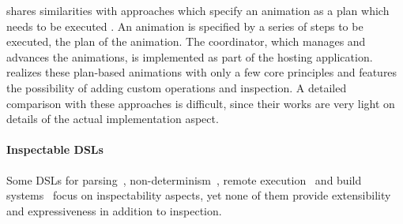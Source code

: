 \dsl{} shares similarities with approaches which specify an animation as a plan
which needs to be executed
\cite{DBLP:conf/chi/KurlanderL95,DBLP:conf/eics/MirlacherPB12}. An
animation is specified by a series of steps to be executed, the
plan of the animation. The coordinator, which manages and advances the
animations, is implemented as part of the hosting application. \dsl{} realizes
these plan-based animations with only a few core principles and features the
possibility of adding custom operations and inspection. A detailed comparison
with these approaches is difficult, since their works are very light on
details of the actual implementation aspect.

\paragraph{Inspectable DSLs}

Some DSLs for
parsing~\cite{DBLP:journals/scp/Hughes00,DBLP:journals/corr/CapriottiK14,DBLP:conf/icfp/Lindley14},
non-determinism~\cite{DBLP:journals/corr/abs-1905-06544}, remote
execution~\cite{DBLP:conf/haskell/Gibbons16,DBLP:conf/haskell/GillSDEFGRSS15}
and build systems~\cite{DBLP:journals/pacmpl/MokhovMJ18} focus on inspectability aspects, yet
none of them provide extensibility and expressiveness in addition to inspection.

